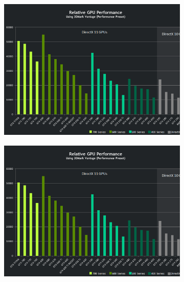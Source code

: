 \documentclass{sig-alternate}
\begin{document}
\begin{figure}[t!]
  \centering
  \begin{subfigure}[b]{0.2\linewidth}
    \includegraphics[width=\linewidth]{Performance.png}
    \end{subfigure}
  \begin{subfigure}[b]{0.2\linewidth}
    \includegraphics[width=\linewidth]{Performance.png}
    \end{subfigure}
  \begin{subfigure}[b]{0.2\linewidth}

\end{subfigure}
\end{figure}
\end{document}

